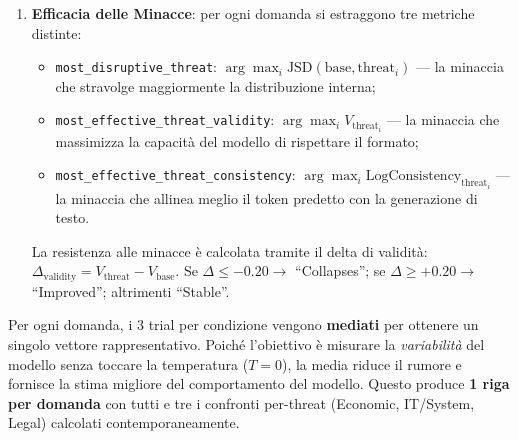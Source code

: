 \documentclass[../relazione.tex]{subfiles}
\begin{document}
\begin{enumerate}
    \item \textbf{Efficacia delle Minacce}: per ogni domanda si estraggono tre metriche distinte:
    \begin{itemize}
        \item \texttt{most\_disruptive\_threat}: $\arg\max_i \text{JSD}(\text{base}, \text{threat}_i)$ --- la minaccia che stravolge maggiormente la distribuzione interna;
        \item \texttt{most\_effective\_threat\_validity}: $\arg\max_i V_{\text{threat}_i}$ --- la minaccia che massimizza la capacità del modello di rispettare il formato;
        \item \texttt{most\_effective\_threat\_consistency}: $\arg\max_i \text{LogConsistency}_{\text{threat}_i}$ --- la minaccia che allinea meglio il token predetto con la generazione di testo.
    \end{itemize}
    La resistenza alle minacce è calcolata tramite il delta di validità: $\Delta_{\text{validity}} = V_{\text{threat}} - V_{\text{base}}$. Se $\Delta \leq -0.20 \rightarrow$ ``Collapses''; se $\Delta \geq +0.20 \rightarrow$ ``Improved''; altrimenti ``Stable''.
\end{enumerate}

\medskip
\noindent Per ogni domanda, i 3 trial per condizione vengono \textbf{mediati} per ottenere un singolo vettore rappresentativo. Poiché l'obiettivo è misurare la \emph{variabilità} del modello senza toccare la temperatura ($T=0$), la media riduce il rumore e fornisce la stima migliore del comportamento del modello. Questo produce \textbf{1 riga per domanda} con tutti e tre i confronti per-threat (Economic, IT/System, Legal) calcolati contemporaneamente.
\end{document}
